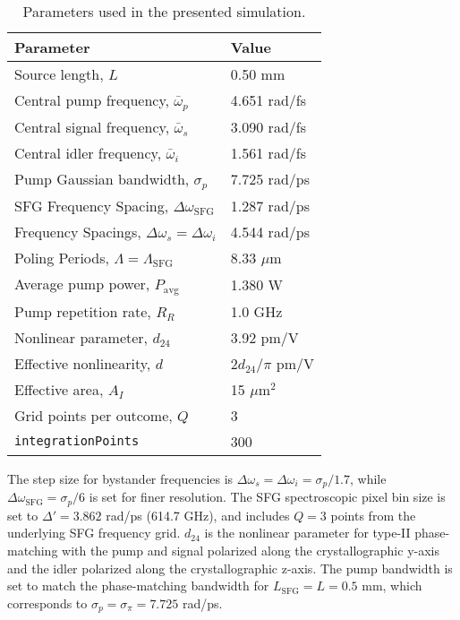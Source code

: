 \documentclass[twocolumn,amssymb, nobibnotes, showpacs, aps, pra,10pt]{revtex4-1}
\newcommand*{\ws}{\omega_{s}}
\newcommand*{\wsfg}{\omega_\textrm{SFG}}
\newcommand*{\Pavg}{P_{\text{avg}}}
\begin{document}
\begin{table}[t] %
\caption{Parameters used in the presented simulation.}
\begin{ruledtabular}
\begin{tabular}{ll}
\textbf{Parameter} &\textbf{Value} \\ \hline
Source length, $L$ & 0.50 mm  \\
Central pump frequency, $\bar{\omega}_p$ & 4.651 rad/fs  \\ %
Central signal frequency, $\bar{\omega}_s$ & 3.090 rad/fs  \\ %
Central idler frequency, $\bar{\omega}_i$ & 1.561 rad/fs  \\ %
Pump Gaussian bandwidth, $\sigma_p$ & 7.725 rad/ps  \\ 
SFG Frequency Spacing, $\Delta \wsfg$ & 1.287 rad/ps \\
Frequency Spacings, $\Delta \ws = \Delta \omega_i$ & 4.544 rad/ps \\ 
Poling Periods, $\Lambda=\Lambda_{\text{SFG}}$ & 8.33 $\mu$m  \\ 
Average pump power, $\Pavg$ & 1.380 W \\ 
Pump repetition rate, $R_R$ & 1.0 GHz \\ 
Nonlinear parameter, $d_{24}$ & 3.92 pm/V\\ 
Effective nonlinearity, $d$ & $2 d_{24}/\pi$ pm/V\\
Effective area, $A_I$ & 15 $\mu\textrm{m}^2$ \\ 
Grid points per outcome, $Q$ &  3 \\ 
{\tt integrationPoints} & 300 \\
\end{tabular}
\end{ruledtabular}
\label{tab:realisticParameters}
\end{table}
The step size for bystander frequencies is $\Delta \ws=\Delta \omega_i=\sigma_p / 1.7$, while $\Delta \omega_\text{SFG} = \sigma_p / 6$ is set for finer resolution. The SFG spectroscopic pixel bin size is set to $\Delta' = 3.862$ rad/ps (614.7 GHz), and includes $Q=3$ points from the underlying SFG frequency grid. $d_{24}$ is the nonlinear parameter for type-II phase-matching with the pump and signal polarized along the crystallographic y-axis and the idler polarized along the crystallographic z-axis. The pump bandwidth is set to match the phase-matching bandwidth for $L_{\text{SFG}}=L=0.5$ mm, which corresponds to $\sigma_p = \sigma_\pi = 7.725$ rad/ps.
\end{document}
